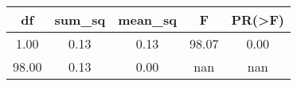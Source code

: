 \begin{tabular}{|c|c|c|c|c|}
\toprule
   df &  sum\_sq &  mean\_sq &     F &  PR(>F) \\
\midrule
 1.00 &    0.13 &     0.13 & 98.07 &    0.00 \\
98.00 &    0.13 &     0.00 &   nan &     nan \\
\bottomrule
\end{tabular}
